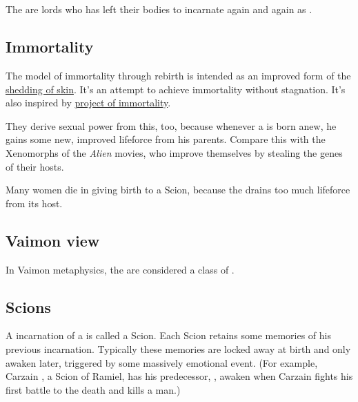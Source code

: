 














\section{\Malachim}
The \Malachim{} are \resphan{} lords who has left their \resphan{} bodies to incarnate again and again as \humans{}. 







\subsection{Immortality}
\label{Malach immortality}
The \Malach{} model of immortality through rebirth is intended as an improved form of the \hyperref[Ophidian immortality]{\ophidian{} shedding of skin}. It's an attempt to achieve immortality without stagnation. It's also inspired by \hyperref[Draconic immortality]{\KhothSellz{} project of \draconic{} immortality}. 

They derive sexual power from this, too, because whenever a \malach{} is born anew, he gains some new, improved lifeforce from his parents. Compare this with the Xenomorphs of the \emph{Alien} movies, who improve themselves by stealing the genes of their hosts. 

Many women die in giving birth to a Scion, because the \malach{} drains too much lifeforce from its host. 







\subsection{Vaimon view}
In Vaimon metaphysics, the \Malachim{} are considered a class of \Archons{}. 







\subsection{Scions}
\label{Scion}
\label{Scions}
A \human{} incarnation of a \Malach{} is called a Scion. Each Scion retains some memories of his previous incarnation. Typically these memories are locked away at birth and only awaken later, triggered by some massively emotional event. (For example, Carzain \Shireyo, a Scion of Ramiel, has his predecessor, \VizicarFull, awaken when Carzain fights his first battle to the death and kills a man.) 

